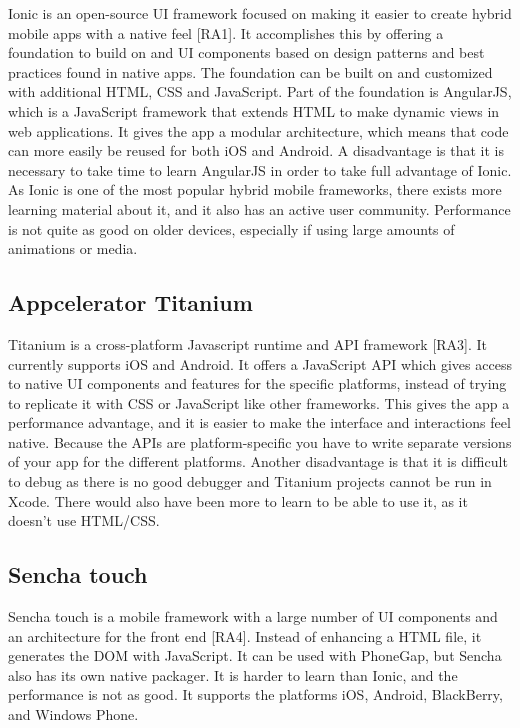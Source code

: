 Ionic is an open-source UI framework focused on making it easier to create hybrid mobile apps with a native feel [RA1]. It accomplishes this by offering a foundation to build on and UI components based on design patterns and best practices found in native apps. The foundation can be built on and customized with additional HTML, CSS and JavaScript. Part of the foundation is AngularJS, which is a JavaScript framework that extends HTML to make dynamic views in web applications. It gives the app a modular architecture, which means that code can more easily be reused for both iOS and Android. A disadvantage is that it is necessary to take time to learn AngularJS in order to take full advantage of Ionic. As Ionic is one of the most popular hybrid mobile frameworks, there exists more learning material about it, and it also has an active user community. Performance is not quite as good on older devices, especially if using large amounts of animations or media.

\subsection{Appcelerator Titanium}

Titanium is a cross-platform Javascript runtime and API framework [RA3]. It currently supports iOS and Android. It offers a JavaScript API which gives access to native UI components and features for the specific platforms, instead of trying to replicate it with CSS or JavaScript like other frameworks. This gives the app a performance advantage, and it is easier to make the interface and interactions feel native. Because the APIs are platform-specific you have to write separate versions of your app for the different platforms. Another disadvantage is that it is difficult to debug as there is no good debugger and Titanium projects cannot be run in Xcode. There would also have been more to learn to be able to use it, as it doesn’t use HTML/CSS.

\subsection{Sencha touch}

Sencha touch is a mobile framework with a large number of UI components and an architecture for the front end [RA4]. Instead of enhancing a HTML file, it generates the DOM with JavaScript. It can be used with PhoneGap, but Sencha also has its own native packager. It is harder to learn than Ionic, and the performance is not as good.  It supports the platforms iOS, Android, BlackBerry, and Windows Phone.

